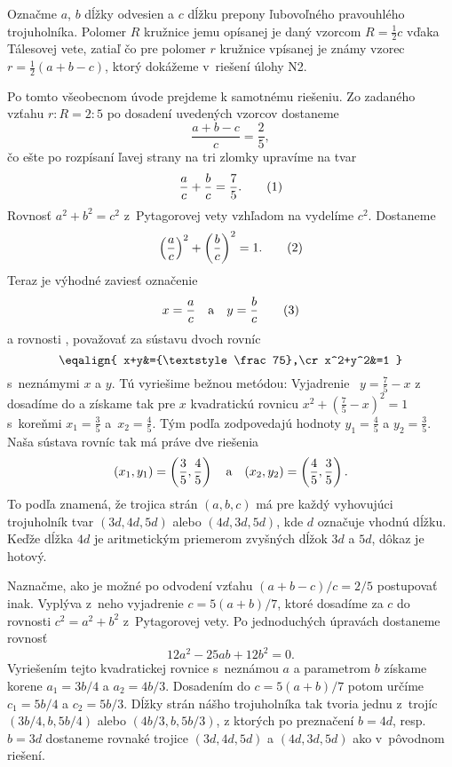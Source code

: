 {%
Označme $a$, $b$ dĺžky odvesien a $c$ dĺžku prepony ľubovoľného
pravouhlého trojuholníka. Polomer $R$ kružnice jemu opísanej je daný
vzorcom $R=\frac12 c$ vďaka Tálesovej vete, zatiaľ čo pre
polomer $r$ kružnice vpísanej je známy vzorec
$r=\frac12({a+b-c})$, ktorý dokážeme v~riešení úlohy N2.

Po tomto všeobecnom úvode prejdeme k samotnému riešeniu.
Zo zadaného vzťahu $r:R=2:5$ po dosadení uvedených vzorcov
dostaneme
$$
\frac{a+b-c}{c}=\frac25,
$$
čo ešte po rozpísaní ľavej strany na tri zlomky upravíme na tvar
$$
\frac ac + \frac bc = \frac 75.
\tag1
$$
Rovnosť $a^2+b^2=c^2$ z~Pytagorovej vety vzhľadom na
 vydelíme $c^2$. Dostaneme
$$
\left(\frac ac\right)^2 + \left(\frac bc\right)^2=1.
\tag2
$$
Teraz je výhodné zaviesť označenie
$$
x=\frac ac \quad\hbox{a}\quad y=\frac bc
\tag3
$$
a rovnosti ,  považovať za sústavu dvoch rovníc
$$
\eqalign{
x+y&={\textstyle\frac 75},\cr
x^2+y^2&=1
}$$
s~neznámymi $x$ a $y$. Tú vyriešime bežnou metódou:
Vyjadrenie ~$y=\frac75-x$ z~ dosadíme do
 a získame tak pre $x$ kvadratickú rovnicu
$x^2+(\frac 75-x)^2=1$ s~koreňmi $x_1=\frac35$ a~$x_2=\frac45$.
Tým podľa  zodpovedajú hodnoty $y_1=\frac45$ a $y_2=\frac35$.
Naša sústava rovníc tak má práve dve riešenia
$$
(x_1,y_1)=\left(\frac 35, \frac 45\right)
\quad\hbox{a}\quad
(x_2,y_2)=\left(\frac 45,\frac 35\right).
$$
To podľa  znamená, že trojica strán $(a,b,c)$ má pre každý
vyhovujúci trojuholník tvar $(3d,4d,5d)$ alebo
$(4d,3d,5d)$, kde $d$ označuje vhodnú dĺžku.
Keďže dĺžka $4d$ je aritmetickým priemerom zvyšných dĺžok $3d$ a
$5d$, dôkaz je hotový.

\poznamka
Naznačme, ako je možné po odvodení vzťahu $(a+b-c)/c=2/5$
postupovať inak. Vyplýva z~neho vyjadrenie $c=5(a+b)/7$, ktoré
dosadíme za $c$ do rovnosti $c^2=a^2+b^2$ z~Pytagorovej vety.
Po jednoduchých úpravách dostaneme rovnosť
$$
12a^2 -25ab+12b^2 = 0.
$$
Vyriešením tejto kvadratickej rovnice s~neznámou $a$ a parametrom $b$
získame korene $a_1=3b/4$ a $a_2=4b/3$. Dosadením do $c=5(a+b)/7$
potom určíme $c_1=5b/4$ a $c_2=5b/3$. Dĺžky strán nášho trojuholníka
tak tvoria jednu z~trojíc $(3b/4,b,5b/4)$ alebo $(4b/3,b,5b/3)$,
z ktorých po preznačení $b=4d$, resp. $b=3d$ dostaneme rovnaké
trojice $(3d,4d,5d)$ a $(4d,3d,5d)$ ako v~pôvodnom riešení.

}
